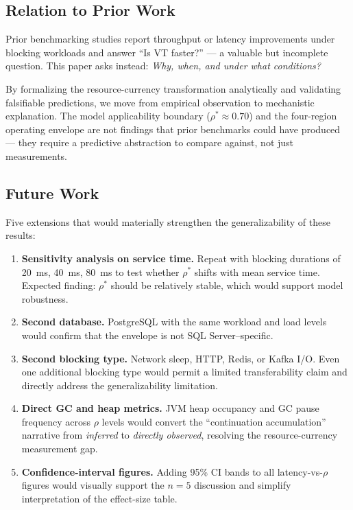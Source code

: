 \documentclass[10pt]{article}
\begin{document}
\subsection{Relation to Prior Work}

Prior benchmarking studies report throughput or latency improvements under blocking workloads and answer ``Is VT faster?'' --- a valuable but incomplete question. This paper asks instead: \emph{Why, when, and under what conditions?}

By formalizing the resource-currency transformation analytically and validating falsifiable predictions, we move from empirical observation to mechanistic explanation. The model applicability boundary ($\rho^* \approx 0.70$) and the four-region operating envelope are not findings that prior benchmarks could have produced --- they require a predictive abstraction to compare against, not just measurements.

\subsection{Future Work}
\label{sec:futurework}

Five extensions that would materially strengthen the generalizability of these results:

\begin{enumerate}
\item \textbf{Sensitivity analysis on service time.} Repeat with blocking durations of 20~ms, 40~ms, 80~ms to test whether $\rho^*$ shifts with mean service time. Expected finding: $\rho^*$ should be relatively stable, which would support model robustness.

\item \textbf{Second database.} PostgreSQL with the same workload and load levels would confirm that the envelope is not SQL Server--specific.

\item \textbf{Second blocking type.} Network sleep, HTTP, Redis, or Kafka I/O. Even one additional blocking type would permit a limited transferability claim and directly address the generalizability limitation.

\item \textbf{Direct GC and heap metrics.} JVM heap occupancy and GC pause frequency across $\rho$ levels would convert the ``continuation accumulation'' narrative from \emph{inferred} to \emph{directly observed}, resolving the resource-currency measurement gap.

\item \textbf{Confidence-interval figures.} Adding 95\% CI bands to all latency-vs-$\rho$ figures would visually support the $n=5$ discussion and simplify interpretation of the effect-size table.
\end{enumerate}
\end{document}
